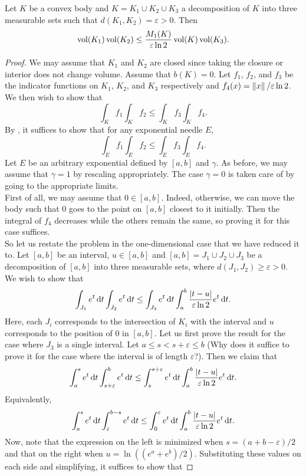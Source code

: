 \begin{ftheo}
	Let $K$ be a convex body and $K = K_1\cup K_2\cup K_3$ a decomposition of $K$ into three measurable sets such that $d(K_1,K_2)=\varepsilon>0$. Then
	\[ \operatorname{vol}(K_1)\operatorname{vol}(K_2) \leq \frac{M_1(K)}{\varepsilon\ln 2} \operatorname{vol}(K)\operatorname{vol}(K_3). \]
\end{ftheo}
\begin{proof}
	We may assume that $K_1$ and $K_2$ are closed since taking the closure or interior does not change volume. Assume that $b(K)=0$. Let $f_1$, $f_2$, and $f_3$ be the indicator functions on $K_1$, $K_2$, and $K_3$ respectively and $f_4(x) = \left\lVert x\right\rVert/\varepsilon\ln 2$. We then wish to show that
	\[ \int_K f_1 \int_K f_2 \leq \int_K f_3 \int_K f_4. \]
	By , it suffices to show that for any exponential needle $E$,
	\[ \int_E f_1 \int_E f_2 \leq \int_E f_3 \int_E f_4. \]
	Let $E$ be an arbitrary exponential defined by $[a,b]$ and $\gamma$. As before, we may assume that $\gamma=1$ by rescaling appropriately. The case $\gamma=0$ is taken care of by going to the appropriate limits.\\
	First of all, we may assume that $0\in[a,b]$. Indeed, otherwise, we can move the body such that $0$ goes to the point on $[a,b]$ closest to it initially. Then the integral of $f_4$ decreases while the others remain the same, so proving it for this case suffices.\\
	So let us restate the problem in the one-dimensional case that we have reduced it to. Let $[a,b]$ be an interval, $u\in[a,b]$ and $[a,b]=J_1\cup J_2 \cup J_3$ be a decomposition of $[a,b]$ into three measurable sets, where $d(J_1,J_2)\geq\varepsilon>0$. We wish to show that
	\[ \int_{J_1} e^t\operatorname{d}\!{t} \int_{J_2} e^t\operatorname{d}\!{t} \leq \int_{J_3} e^t\operatorname{d}\!{t} \int_a^b \frac{|t-u|}{\varepsilon\ln 2}e^t\operatorname{d}\!{t}. \]
	Here, each $J_i$ corresponds to the intersection of $K_i$ with the interval and $u$ corresponds to the position of $0$ in $[a,b]$. Let us first prove the result for the case where $J_3$ is a single interval. Let $a\leq s< s+\varepsilon\leq b$ (Why does it suffice to prove it for the case where the interval is of length $\varepsilon$?). Then we claim that
	\[ \int_a^s e^t\operatorname{d}\!{t} \int_{s+\varepsilon}^b e^t\operatorname{d}\!{t} \leq \int_s^{s+\varepsilon}e^t\operatorname{d}\!{t} \int_a^b \frac{|t-u|}{\varepsilon\ln 2}e^t\operatorname{d}\!{t}. \]
	Equivalently,
	\[ \int_a^s e^t\operatorname{d}\!{t} \int_\varepsilon^{b-s} e^t\operatorname{d}\!{t} \leq \int_0^\varepsilon e^t\operatorname{d}\!{t} \int_a^b \frac{|t-u|}{\varepsilon\ln 2}e^t\operatorname{d}\!{t}. \]
	Now, note that the expression on the left is minimized when $s=(a+b-\varepsilon)/2$ and that on the right when $u=\ln((e^a+e^b)/2)$. Substituting these values on each side and simplifying, it suffices to show that

\end{proof}
